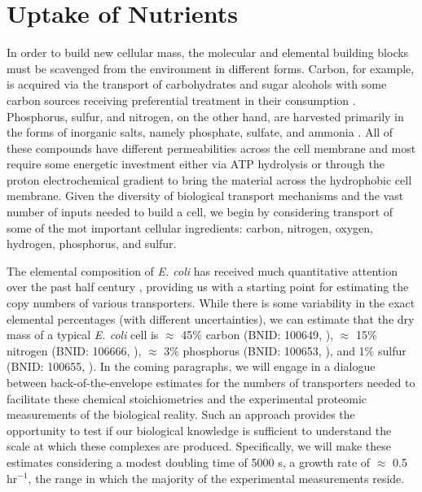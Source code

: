 \section{Uptake of Nutrients}
In order to build new cellular mass, the molecular and elemental building blocks
must be scavenged from the environment in different forms. Carbon, for example,
is acquired via the transport of carbohydrates and sugar alcohols with some
carbon sources receiving preferential treatment in their consumption
\citep{monod1947}. Phosphorus, sulfur, and nitrogen, on the other hand, are
harvested primarily in the forms of inorganic salts, namely phosphate, sulfate,
and ammonia \citep{jun2018, assentoft2016, stasi2019, antonenko1997,
rosenberg1977, willsky1973}. All of these compounds have different
permeabilities across the cell membrane and most require some energetic
investment either via ATP hydrolysis or through the proton electrochemical
gradient to bring the material across the hydrophobic cell membrane. Given the
diversity of biological transport mechanisms and the vast number of inputs
needed to build a cell, we begin by considering transport of some of the mot
important cellular ingredients: carbon, nitrogen, oxygen, hydrogen, phosphorus,
and sulfur.

The elemental composition of \textit{E. coli} has received much quantitative
attention over the past half century \citep{neidhardt1991, taymaz-nikerel2010,
heldal1985, bauer1976}, providing us with a starting point for estimating the
copy numbers of various transporters. While there is some variability in the
exact elemental percentages (with different uncertainties), we can estimate that
the dry mass of a typical \textit{E. coli} cell is $\approx$ 45\% carbon (BNID:
100649, \cite{milo2010}), $\approx$ 15\% nitrogen (BNID: 106666,
\cite{milo2010}), $\approx$ 3\% phosphorus (BNID: 100653, \cite{milo2010}), and
1\% sulfur (BNID: 100655, \cite{milo2010}). In the coming paragraphs, we will
engage in a dialogue between back-of-the-envelope estimates for the numbers of
transporters needed to facilitate these chemical stoichiometries and the
experimental proteomic measurements of the biological reality. Such an approach
provides the opportunity to test if our biological knowledge is sufficient to
understand the scale at which these complexes are produced. Specifically, we
will make these estimates considering a modest doubling time of 5000 s, a growth
rate of $\approx$ 0.5 hr$^{-1}$, the range in which the majority of the
experimental measurements reside.

